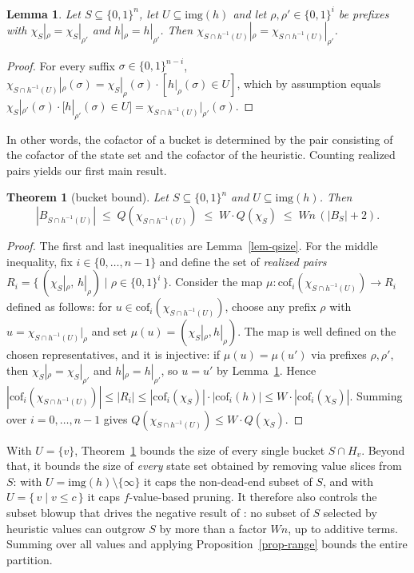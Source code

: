 \documentclass[letterpaper]{article}
\newcommand{\bddsize}[1]{\ensuremath{|B_{#1}|}}
\newcommand{\cofcount}{\ensuremath{Q}}
\newcommand{\level}[2]{\ensuremath{H_{#2}}}
\newcommand{\sub}[2]{\ensuremath{\mathrm{cof}_{#1}(#2)}}
\newcommand{\img}{\ensuremath{\mathrm{img}}}
\theoremstyle{plain}
\newtheorem{theorem}{Theorem}
\newtheorem{lemma}{Lemma}
\theoremstyle{definition}
\theoremstyle{remark}
\begin{document}
\begin{lemma}
\label{lem-pair}
Let $S \subseteq \{0,1\}^n$, let $U \subseteq \img(h)$ and let
$\rho, \rho' \in \{0,1\}^i$ be prefixes with
$\chi_S|_\rho = \chi_S|_{\rho'}$ and $h|_\rho = h|_{\rho'}$. Then
$\chi_{S \cap h^{-1}(U)}|_\rho = \chi_{S \cap h^{-1}(U)}|_{\rho'}$.
\end{lemma}

\begin{proof}
For every suffix $\sigma \in \{0,1\}^{n-i}$,
$\chi_{S \cap h^{-1}(U)}|_\rho(\sigma) = \chi_S|_\rho(\sigma) \cdot
[h|_\rho(\sigma) \in U]$, which by assumption equals
$\chi_S|_{\rho'}(\sigma) \cdot [h|_{\rho'}(\sigma) \in U]
= \chi_{S \cap h^{-1}(U)}|_{\rho'}(\sigma)$.
\end{proof}

In other words, the cofactor of a bucket is determined by the pair
consisting of the cofactor of the state set and the cofactor of the
heuristic. Counting realized pairs yields our first main result.

\begin{theorem}[bucket bound]
\label{thm-bucket}
Let $S \subseteq \{0,1\}^n$ and $U \subseteq \img(h)$. Then
\[
\bddsize{S \cap h^{-1}(U)}
\;\leq\; \cofcount(\chi_{S \cap h^{-1}(U)})
\;\leq\; W \cdot \cofcount(\chi_S)
\;\leq\; W n \, (\bddsize{S} + 2).
\]
\end{theorem}

\begin{proof}
The first and last inequalities are Lemma~\ref{lem-qsize}. For the
middle inequality, fix $i \in \{0, \dots, n-1\}$ and define the set of
\emph{realized pairs}
$R_i = \{\, (\chi_S|_\rho,\, h|_\rho) \mid \rho \in \{0,1\}^i \,\}$.
Consider the map
$\mu \colon \sub{i}{\chi_{S \cap h^{-1}(U)}} \to R_i$ defined as
follows: for $u \in \sub{i}{\chi_{S \cap h^{-1}(U)}}$, choose any
prefix $\rho$ with $u = \chi_{S \cap h^{-1}(U)}|_\rho$ and set
$\mu(u) = (\chi_S|_\rho, h|_\rho)$. The map is well defined on the
chosen representatives, and it is injective: if
$\mu(u) = \mu(u')$ via prefixes $\rho, \rho'$, then
$\chi_S|_\rho = \chi_S|_{\rho'}$ and $h|_\rho = h|_{\rho'}$, so
$u = u'$ by Lemma~\ref{lem-pair}. Hence
$|\sub{i}{\chi_{S \cap h^{-1}(U)}}| \leq |R_i|
\leq |\sub{i}{\chi_S}| \cdot |\sub{i}{h}|
\leq W \cdot |\sub{i}{\chi_S}|$.
Summing over $i = 0, \dots, n-1$ gives
$\cofcount(\chi_{S \cap h^{-1}(U)}) \leq W \cdot \cofcount(\chi_S)$.
\end{proof}

With $U = \{v\}$, Theorem~\ref{thm-bucket} bounds the size of every
single bucket $S \cap \level{h}{v}$. Beyond that, it bounds the size of
\emph{every} state set obtained by removing value slices from $S$: with
$U = \img(h) \setminus \{\infty\}$ it caps the non-dead-end subset of
$S$, and with $U = \{\, v \mid v \leq c \,\}$ it caps $f$-value-based
pruning. It therefore also controls the subset blowup that drives the
negative result of \citet{speck-et-al-icaps2020}: no subset of $S$
selected by heuristic values can outgrow $S$ by more than a factor
$Wn$, up to additive terms. Summing over all values and applying
Proposition~\ref{prop-range} bounds the entire partition.
\end{document}
